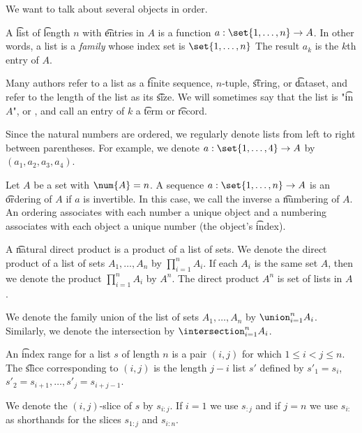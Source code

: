 
We want to talk about several objects in order.


A \t{list} of \t{length} $n$ with \t{entries} in $A$ is a function $a: \set{1, \dots, n} \to A$.
In other words, a list is a \textit{family} whose index set is $\set{1, \dots, n}$
The result $a_k$ is the \t{$k$th entry} of $A$.

Many authors refer to a list as a \t{finite sequence}, \t{$n$-tuple}, \t{string}, or \t{dataset}, and refer to the length of the list as its \t{size}.
We will sometimes say that the list is "\t{in} $A$", or , and call an entry of $k$ a \t{term} or \t{record}.


Since the natural numbers are ordered, we regularly denote lists from left to right between parentheses.
For example, we denote $a: \set{1, \dots, 4} \to A$ by $(a_1, a_2, a_3, a_4)$.

Let $A$ be a set with $\num{A} = n$.
A sequence $a: \set{1, \dots, n} \to A$ is an \t{ordering} of $A$ if $a$ is invertible.
In this case, we call the inverse a \t{numbering} of $A$.
An ordering associates with each number a unique object and a numbering associates with each object a unique number (the object's \t{index}).


A \t{natural direct product} is a product of a list of sets.
We denote the direct product of a list of sets $A_1, \dots, A_n$ by $\prod_{i = 1}^{n} A_i$.
If each $A_i$ is the same set $A$, then we denote the product $\prod_{i = 1}^{n} A_i$ by $A^n$.
The direct product $A^n$ is set of lists in $A$ .

We denote the family union of the list of sets $A_1, \dots, A_n$ by $\union_{i = 1}^{n} A_i$.
Similarly, we denote the intersection by $\intersection_{i = 1}^{n} A_i$.

An \t{index range} for a list $s$ of length $n$ is a pair $(i, j)$ for which $1 \leq i < j \leq n$.
The \t{slice} corresponding to $(i,j)$ is the length $j-i$ list $s'$ defined by $s'_1 = s_{i}$, $s'_2 = s_{i+1}, \dots, s'_{j} = s_{i + j-1}$.

We denote the $(i,j)$-slice of $s$ by $s_{i:j}$.
If $i = 1$ we use $s_{:j}$ and if $j = n$ we use $s_{i:}$ as shorthands for the slices $s_{1:j}$ and $s_{i:n}$.
